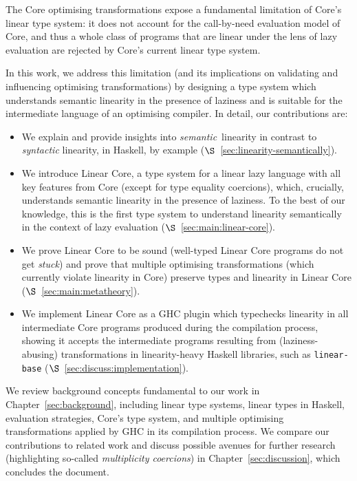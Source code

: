 \documentclass[acmsmall, screen, review]{acmart}
\begin{document}

The Core optimising transformations expose a fundamental limitation of Core's
linear type system: it does not account for the call-by-need evaluation model
of Core, and thus a whole class of programs that are linear under the lens of
lazy evaluation are rejected by Core's current linear type system.

In this work, we address this limitation (and its implications on validating
and influencing optimising transformations) by designing a type system which
understands semantic linearity in the presence of laziness and is suitable for
the intermediate language of an optimising compiler.
%
In detail, our contributions are:
%
\begin{itemize}

\item We explain and provide insights into \emph{semantic} linearity in
contrast to \emph{syntactic} linearity, in Haskell, by example
($\S$~\ref{sec:linearity-semantically}).

\item We introduce Linear Core, a type system for a linear lazy language with
all key features from Core (except for type equality coercions), which,
crucially, understands semantic linearity in the presence of laziness. To the
best of our knowledge, this is the first type system to understand linearity
semantically in the context of lazy evaluation
($\S$~\ref{sec:main:linear-core}).

\item We prove Linear Core to be sound (well-typed Linear Core programs do not
get \emph{stuck}) and prove that multiple optimising transformations (which
currently violate linearity in Core) preserve types and linearity in Linear
Core ($\S$~\ref{sec:main:metatheory}).

\item We implement Linear Core as a GHC plugin which typechecks linearity in
all intermediate Core programs produced during the compilation process, showing
it accepts the intermediate programs resulting from (laziness-abusing)
transformations in linearity-heavy Haskell libraries, such as
\texttt{linear-base} ($\S$~\ref{sec:discuss:implementation}).

\end{itemize}
%
We review background concepts fundamental to our work in
Chapter~\ref{sec:background}, including linear type systems, linear types in
Haskell, evaluation strategies, Core's type system, and multiple optimising
transformations applied by GHC in its compilation process.
%
We compare our contributions to related work and discuss possible
avenues for further research (highlighting so-called \emph{multiplicity
coercions}) in Chapter~\ref{sec:discussion}, which concludes the document.
\end{document}
